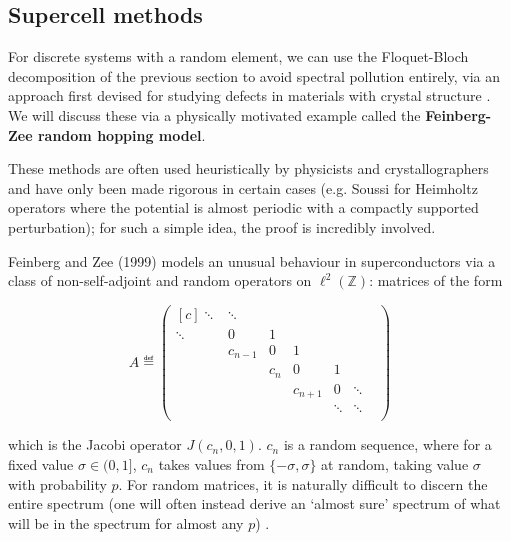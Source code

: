 \documentclass[../main.tex]{subfiles}
\begin{document}
\subsection{Supercell methods}
For discrete systems with a random element, we can use the Floquet-Bloch decomposition of the previous section to avoid spectral pollution entirely, via an approach first devised for studying defects in materials with crystal structure \cite{nieminen2007supercell}. We will discuss these via a physically motivated example called the \textbf{Feinberg-Zee random hopping model}. 

These methods are often used heuristically by physicists and crystallographers
and have only been made rigorous in certain cases (e.g. Soussi \cite{soussi2006convergence} for Heimholtz operators where the potential is almost periodic with a compactly supported perturbation); for such a simple idea, the proof is incredibly involved. 

Feinberg and Zee (1999) \cite{feinberg1999nonhermitian} models an unusual behaviour in superconductors via a class of non-self-adjoint and random operators on $\ell^2(\mathbb{Z})$: matrices of the form

$$
A \eqdef \begin{pmatrix*}[c]
\ddots & \ddots & & & & \\
\ddots & 0 & 1 & & & \\
& c_{n-1} & 0 & 1 & & \\
& & c_{n} & 0 & 1 & \\
& & & c_{n+1} & 0 & \ddots \\
& & & & \ddots & \ddots & \\
\end{pmatrix*}
$$

which is the Jacobi operator $J(c_n, 0, 1)$. $c_n$ is a random sequence, where for a fixed value $\sigma \in (0, 1]$, $c_n$ takes values from $\{-\sigma, \sigma\}$ at random, taking value $\sigma$ with probability $p$. For random matrices, it is naturally difficult to discern the entire spectrum (one will often instead derive an `almost sure' spectrum of what will be in the spectrum for almost any $p$) \cite{chandler-wilde2012spectrum}.\\
\end{document}
